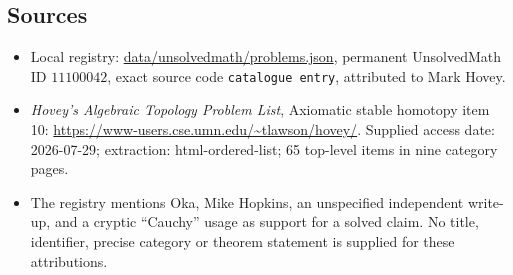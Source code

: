 \documentclass[11pt]{article}
\begin{document}
\subsection{Sources}
\begin{itemize}
\item Local registry: \url{data/unsolvedmath/problems.json}, permanent UnsolvedMath ID $11100042$, exact source code \texttt{catalogue entry}, attributed to Mark Hovey.
\item \emph{Hovey's Algebraic Topology Problem List}, Axiomatic stable homotopy item 10: \url{https://www-users.cse.umn.edu/~tlawson/hovey/}. Supplied access date: 2026-07-29; extraction: html-ordered-list; 65 top-level items in nine category pages.
\item The registry mentions Oka, Mike Hopkins, an unspecified independent write-up, and a cryptic ``Cauchy'' usage as support for a solved claim. No title, identifier, precise category or theorem statement is supplied for these attributions.
\end{itemize}
\end{document}
